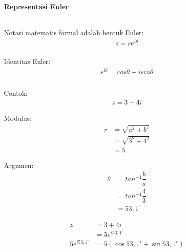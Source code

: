 \documentclass{article}
\begin{document}
\newpage
\begin{center}
    \textbf{Representasi Euler}
\end{center}
\leavevmode\\

Notasi matematis formal adalah bentuk Euler:
\begin{align}
    z = re^{i\theta} \\\nonumber
\end{align}

Identitas Euler:
\begin{align}
    e^{i\theta} = cos\theta + i sin\theta \\\nonumber
\end{align}
\leavevmode\\

Contoh:
\begin{align}
    z = 3 + 4i \nonumber
\end{align}

Modulus:
\begin{align}
    r & = \sqrt{a^2 + b^2}
    \nonumber              \\
      & = \sqrt{3^2 + 4^2}
    \nonumber              \\
      & = 5
    \nonumber
\end{align}

Argumen:
\begin{align}
    \theta & = tan^{-1} \dfrac{b}{a}
    \nonumber                        \\
           & = tan^{-1} \dfrac{4}{3}
    \nonumber                        \\
           & = 53,1^{\circ}
    \nonumber
\end{align}

\begin{align}
    z                   & = 3 + 4i
    \nonumber                                                        \\
                        & = 5e^{i 53,1^{\circ}}
    \nonumber                                                        \\
    5e^{i 53,1^{\circ}} & = 5(\cos 53,1^{\circ} + \sin 53,1^{\circ})
    \nonumber
\end{align}
\end{document}
